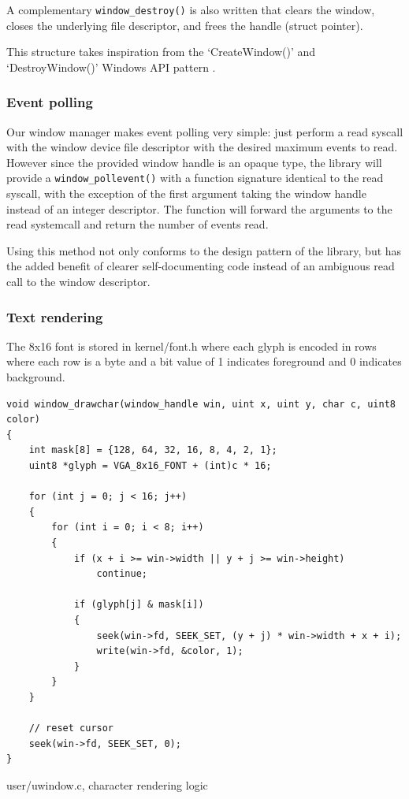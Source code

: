 A complementary \texttt{window_destroy()} is also written that clears
the window, closes the underlying file descriptor, and frees the handle (struct pointer).

This structure takes inspiration from the `CreateWindow()' and `DestroyWindow()' 
Windows API pattern \cite{windowsapi:window}.

\subsubsection{Event polling}
Our window manager makes event polling very simple: just perform a read syscall
with the window device file descriptor with the desired maximum events to read.
However since the provided window handle is an opaque type, the library will provide
a \texttt{window_pollevent()} with a function signature identical to the read syscall,
with the exception of the first argument taking the window handle instead of an integer 
descriptor. The function will forward the arguments to the read systemcall and return
the number of events read. 

Using this method not only conforms to the design pattern of the library, but
has the added benefit of clearer self-documenting code instead of an ambiguous
read call to the window descriptor.

\subsubsection{Text rendering}
The 8x16 font is stored in kernel/font.h where each glyph is encoded in rows where 
each row is a byte and a bit value of 1 indicates foreground and 0 indicates background.

\begin{listing}[h]
    \begin{verbatim}
void window_drawchar(window_handle win, uint x, uint y, char c, uint8 color)
{
    int mask[8] = {128, 64, 32, 16, 8, 4, 2, 1};
    uint8 *glyph = VGA_8x16_FONT + (int)c * 16;

    for (int j = 0; j < 16; j++)
    {
        for (int i = 0; i < 8; i++)
        {
            if (x + i >= win->width || y + j >= win->height)
                continue;
            
            if (glyph[j] & mask[i])
            {
                seek(win->fd, SEEK_SET, (y + j) * win->width + x + i);
                write(win->fd, &color, 1);
            }
        }
    }

    // reset cursor
    seek(win->fd, SEEK_SET, 0);
}
    \end{verbatim}
    \caption{user/uwindow.c, character rendering logic}
    \label{listing:charrender}
\end{listing}

